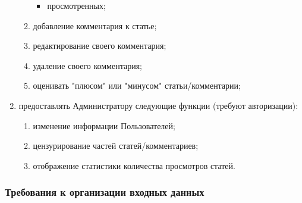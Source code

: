 \documentclass{bmstu-gost-7-32}
\begin{document}
\begin{enumerate}
\begin{enumerate}
\begin{itemize}
			\item просмотренных;
		\end{itemize}
		\item добавление комментария к статье;
		\item редактирование своего комментария;
		\item удаление своего комментария;
		\item оценивать "плюсом" или "минусом" статьи/комментарии;
	\end{enumerate}
	\item предоставлять Администратору следующие функции (требуют авторизации):
	\begin{enumerate}
		\item изменение информации Пользователей;
		\item цензурирование частей статей/комментариев;
		\item отображение статистики количества просмотров статей.
	\end{enumerate}
\end{enumerate}

\subsubsection{Требования к организации входных данных}
\end{document}
